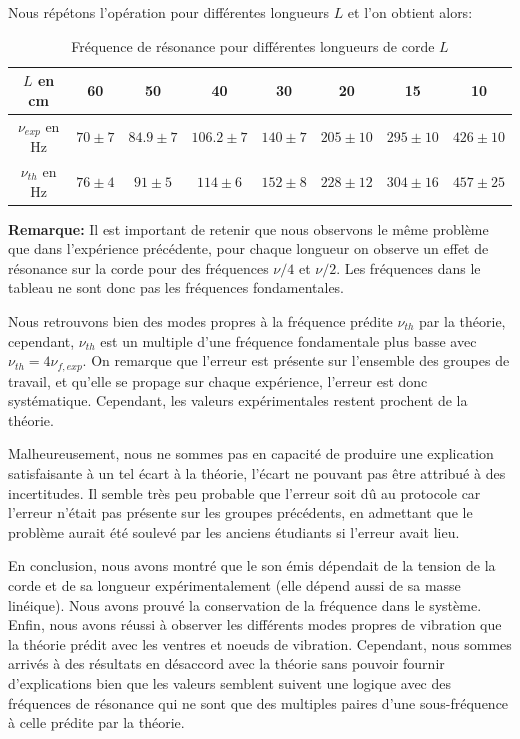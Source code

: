 \documentclass[12pt]{article}
\begin{document}
Nous répétons l'opération pour différentes longueurs $L$ et l'on obtient alors:

\begin{table}[h!]
	\centering
	\begin{tabular}{||c c c c c c c c||} 
		\hline
		$L$ en cm & 60 & 50 & 40 & 30 & 20 & 15 & 10 \\
		\hline
        $\nu_{exp}$ en Hz & $70 \pm 7$ & $84.9 \pm 7$ & $106.2 \pm 7$ & $140 \pm 7$ & $205 \pm 10$ & $295 \pm 10$ & $426 \pm 10$ \\
        $\nu_{th}$ en Hz & $76 \pm 4$ & $91 \pm 5$ & $114 \pm 6$ & $152 \pm 8$ & $228 \pm 12$ & $304 \pm 16$ & $457 \pm 25$ \\
		\hline
	\end{tabular}
	\caption{Fréquence de résonance pour différentes longueurs de corde $L$}
	\label{table:2}
\end{table}

\textbf{Remarque:} Il est important de retenir que nous observons le même problème que dans l'expérience précédente, pour chaque longueur on observe un effet de résonance sur la corde
pour des fréquences $\nu/4$ et $\nu / 2$. Les fréquences dans le tableau ne sont donc pas les fréquences fondamentales.

Nous retrouvons bien des modes propres à la fréquence prédite $\nu_{th}$ par la théorie, cependant, $\nu_{th}$ est un multiple d'une fréquence fondamentale plus basse avec $\nu_{th} = 4 \nu_{f,exp}$.
On remarque que l'erreur est présente sur l'ensemble des groupes de travail, et qu'elle se propage sur chaque expérience, l'erreur est donc systématique. Cependant, les valeurs expérimentales restent prochent
de la théorie.

Malheureusement, nous ne sommes pas en capacité de produire une explication satisfaisante à un tel écart à la théorie, l'écart ne pouvant pas être attribué à des incertitudes. Il semble très peu probable
que l'erreur soit dû au protocole car l'erreur n'était pas présente sur les groupes précédents, en admettant que le problème aurait été soulevé par les anciens étudiants si l'erreur avait lieu.

En conclusion, nous avons montré que le son émis dépendait de la tension de la corde et de sa longueur expérimentalement (elle dépend aussi de sa masse linéique). Nous avons prouvé la conservation de la fréquence dans le système.
Enfin, nous avons réussi à observer les différents modes propres de vibration que la théorie prédit avec les ventres et noeuds de vibration. Cependant, nous sommes arrivés à des résultats en désaccord avec la théorie
sans pouvoir fournir d'explications bien que les valeurs semblent suivent une logique avec des fréquences de résonance qui ne sont que des multiples paires d'une sous-fréquence à celle prédite par la théorie.
\end{document}
